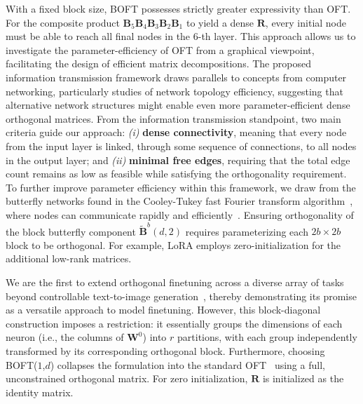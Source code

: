 \begin{theorem}
    With a fixed block size, BOFT possesses strictly greater expressivity than OFT. For the composite product $\bm{B}_5\bm{B}_4\bm{B}_3\bm{B}_2\bm{B}_1$ to yield a dense $\bm{R}$, every initial node must be able to reach all final nodes in the $6$-th layer. This approach allows us to investigate the parameter-efficiency of OFT from a graphical viewpoint, facilitating the design of efficient matrix decompositions. The proposed information transmission framework draws parallels to concepts from computer networking, particularly studies of network topology efficiency, suggesting that alternative network structures might enable even more parameter-efficient dense orthogonal matrices. From the information transmission standpoint, two main criteria guide our approach: \emph{(i)} \textbf{dense connectivity}, meaning that every node from the input layer is linked, through some sequence of connections, to all nodes in the output layer; and \emph{(ii)} \textbf{minimal free edges}, requiring that the total edge count remains as low as feasible while satisfying the orthogonality requirement. To further improve parameter efficiency within this framework, we draw from the butterfly networks found in the Cooley-Tukey fast Fourier transform algorithm~\cite{cooley1965algorithm}, where nodes can communicate rapidly and efficiently~\cite{klasing1994broadcasting}. Ensuring orthogonality of the block butterfly component $\tilde{\bm{B}}^b(d,2)$ requires parameterizing each $2b\times 2b$ block to be orthogonal. For example, LoRA employs zero-initialization for the additional low-rank matrices. \item We are the first to extend orthogonal finetuning across a diverse array of tasks beyond controllable text-to-image generation~\cite{qiu2023controlling}, thereby demonstrating its promise as a versatile approach to model finetuning. However, this block-diagonal construction imposes a restriction: it essentially groups the dimensions of each neuron (i.e., the columns of $\bm{W}^0$) into $r$ partitions, with each group independently transformed by its corresponding orthogonal block. Furthermore, choosing BOFT($1$,$d$) collapses the formulation into the standard OFT~\cite{qiu2023controlling} using a full, unconstrained orthogonal matrix. For zero initialization, $\bm{R}$ is initialized as the identity matrix. \end{theorem}

